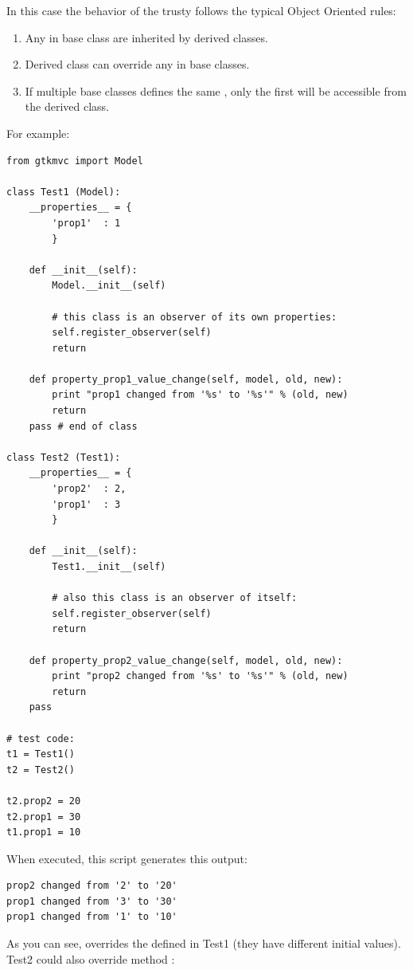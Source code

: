 In this case the behavior of the \OP trusty follows the typical Object
Oriented rules:
\begin{enumerate}
    \item Any \OP in base class are inherited by derived classes.
    \item Derived class can override any \OP in base classes.
    \item If multiple base classes defines the same \OP, only the
      first \OP will be accessible from the derived class.
\end{enumerate}

For example:

{ \codesize
\begin{verbatim} 
from gtkmvc import Model

class Test1 (Model):
    __properties__ = {
        'prop1'  : 1
        }

    def __init__(self):
        Model.__init__(self)

        # this class is an observer of its own properties:
        self.register_observer(self) 
        return
    
    def property_prop1_value_change(self, model, old, new):
        print "prop1 changed from '%s' to '%s'" % (old, new)
        return
    pass # end of class

class Test2 (Test1):    
    __properties__ = {
        'prop2'  : 2,
        'prop1'  : 3
        }
    
    def __init__(self):
        Test1.__init__(self)
        
        # also this class is an observer of itself:
        self.register_observer(self)
        return
    
    def property_prop2_value_change(self, model, old, new):
        print "prop2 changed from '%s' to '%s'" % (old, new)
        return
    pass

# test code:
t1 = Test1()
t2 = Test2()

t2.prop2 = 20
t2.prop1 = 30
t1.prop1 = 10
\end{verbatim}
}

When executed, this script generates this output:
{ \codesize 
\begin{verbatim} 
prop2 changed from '2' to '20'
prop1 changed from '3' to '30'
prop1 changed from '1' to '10'
\end{verbatim}
}

As you can see,  overrides the \OP {}
defined in Test1 (they have different initial values).  Test2 could
also override method :

